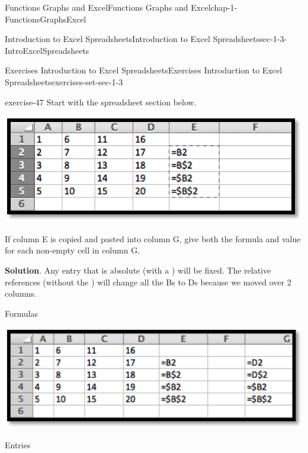 \documentclass[oneside,10pt,]{book}
\numberwithin{equation}{section}
\begin{document}
\begin{chapterptx}{Functions Graphs and Excel}{}{Functions Graphs and Excel}{}{}{chap-1-FunctionsGraphsExcel}
\begin{sectionptx}{Introduction to Excel Spreadsheets}{}{Introduction to Excel Spreadsheets}{}{}{sec-1-3-IntroExcelSpreadsheets}
\begin{exercises-subsection-numberless}{Exercises Introduction to Excel Spreadsheets}{}{Exercises Introduction to Excel Spreadsheets}{}{}{exercises-set-sec-1-3}
\begin{divisionexercise}{5}{}{}{exercise-47}
\hypertarget{p-290}{}%
Start with the spreadsheet section below. \leavevmode%
\begin{sidebyside}{1}{0.2}{0.2}{0}%
\begin{sbspanel}{0.6}%
\includegraphics[width=1\linewidth]{images/sec1-3-e2.png}
\end{sbspanel}%
\end{sidebyside}%
 If column E is copied and pasted into column G, give both the formula and value for each non-empty cell in column G.%
\par\smallskip%
\noindent\textbf{Solution}.\hypertarget{solution-24}{}\quad%
\hypertarget{p-291}{}%
Any entry that is absolute (with a \textdollar{}) will be fixed. The relative references (without the \textdollar{}) will change all the Bs to Ds because we moved over 2 columns.%
\par
\hypertarget{p-292}{}%
Formulas \leavevmode%
\begin{sidebyside}{1}{0.1}{0.1}{0}%
\begin{sbspanel}{0.8}%
\includegraphics[width=1\linewidth]{images/sec1-3-sol5a.png}
\end{sbspanel}%
\end{sidebyside}%
%
\par
\hypertarget{p-293}{}%
Entries \leavevmode%
\begin{sidebyside}{1}{0.1}{0.1}{0}%
\begin{sbspanel}{0.8}%

\end{sbspanel}
\end{sidebyside}
\end{divisionexercise}
\end{exercises-subsection-numberless}
\end{sectionptx}
\end{chapterptx}
\end{document}

